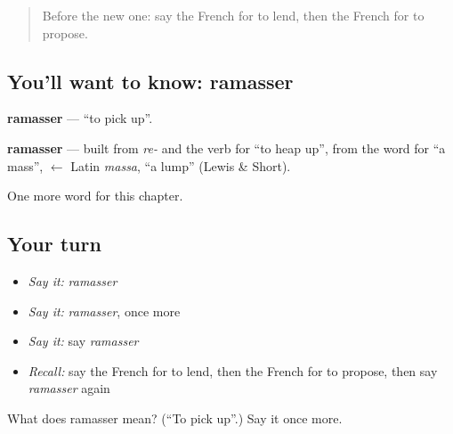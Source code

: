 \begin{quote}
Before the new one: say the French for to lend, then the French for to propose.
\end{quote}

\subsection*{You'll want to know: ramasser}
\textbf{ramasser} — \textquotedblleft{}to pick up\textquotedblright{}.

\begin{cousinweb}
\textbf{ramasser} — built from \emph{re-} and the verb for \textquotedblleft{}to heap up\textquotedblright{}, from the word for \textquotedblleft{}a mass\textquotedblright{}, $\leftarrow$ Latin \emph{massa}, \textquotedblleft{}a lump\textquotedblright{} (Lewis \& Short).
\end{cousinweb}

\begin{grammarlens}[title={What you've built}]
One more word for this chapter.
\end{grammarlens}

\subsection*{Your turn}
\begin{itemize}
\raggedright
  \item \emph{Say it:} \emph{ramasser}
  \item \emph{Say it:} \emph{ramasser}, once more
  \item \emph{Say it:} say \emph{ramasser}
  \item \emph{Recall:} say the French for to lend, then the French for to propose, then say \emph{ramasser} again
\end{itemize}

\begin{tcolorbox}[breakable,colback=teal!4,colframe=teal!35!black,title={Before you move on}]
What does ramasser mean? (\textquotedblleft{}To pick up\textquotedblright{}.) Say it once more.
\end{tcolorbox}
